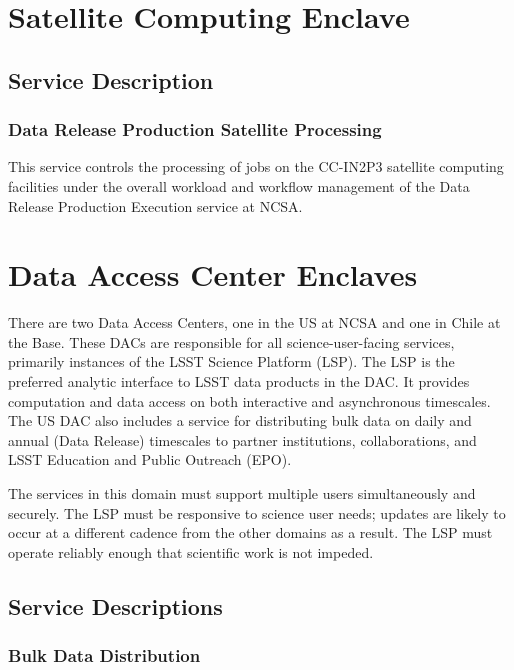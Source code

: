 \documentclass[DM,lsstdraft,toc]{lsstdoc}
\begin{document}
\section{Satellite Computing Enclave}\label{satellite-computing-enclave}

\subsection{Service Description}\label{service-description}

\subsubsection{Data Release Production Satellite
Processing}\label{data-release-production-satellite-processing}

This service controls the processing of jobs on the CC-IN2P3 satellite
computing facilities under the overall workload and workflow management
of the Data Release Production Execution service at NCSA.

\section{Data Access Center Enclaves}\label{data-access-center-enclaves}

There are two Data Access Centers, one in the US at NCSA and one in
Chile at the Base. These DACs are responsible for all
science-user-facing services, primarily instances of the LSST Science
Platform (LSP). The LSP is the preferred analytic interface to LSST data
products in the DAC. It provides computation and data access on both
interactive and asynchronous timescales. The US DAC also includes a
service for distributing bulk data on daily and annual (Data Release)
timescales to partner institutions, collaborations, and LSST Education
and Public Outreach (EPO).

The services in this domain must support multiple users simultaneously
and securely. The LSP must be responsive to science user needs; updates
are likely to occur at a different cadence from the other domains as a
result. The LSP must operate reliably enough that scientific work is not
impeded.

\subsection{Service Descriptions}\label{service-descriptions-3}

\subsubsection{Bulk Data Distribution}\label{bulk-data-distribution}
\end{document}
